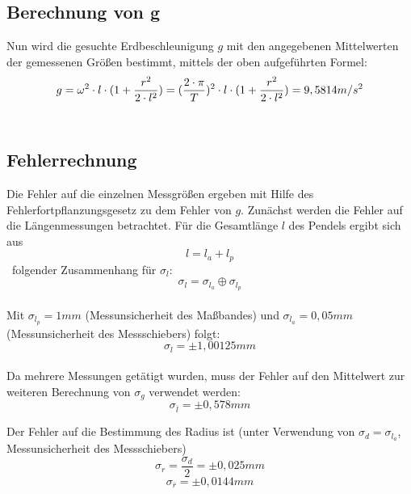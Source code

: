 \documentclass[a4paper, 11pt]{article}
\begin{document}
\subsection{Berechnung von g}
Nun wird die gesuchte Erdbeschleunigung $g$ mit den angegebenen Mittelwerten der gemessenen Größen bestimmt, mittels der oben aufgeführten Formel:
\begin{equation*}
g = \omega^2 \cdot l \cdot (1+\frac{r^2}{2 \cdot l^2})   \\  
= (\frac{2\cdot \pi}{T}) ^2 \cdot l \cdot (1+\frac{r^2}{2 \cdot l^2}) = 9,5814 m/s^2
\end{equation*}\

\subsection{Fehlerrechnung}
Die Fehler auf die einzelnen Messgrößen ergeben mit Hilfe des Fehlerfortpflanzungsgesetz zu dem Fehler von $g$.
Zunächst werden die Fehler auf die Längenmessungen betrachtet.
Für die Gesamtlänge $l$ des Pendels ergibt sich aus \begin{equation*}
l = l_a + l_p
\end{equation*}\
folgender Zusammenhang für $\sigma_l $:
\\
\begin{equation*}
\sigma_l = \sigma_{l_a} \oplus \sigma_{l_p}
\end{equation*}
\\
Mit $\sigma_{l_p}=1mm$ (Messunsicherheit des Maßbandes) und $\sigma_{l_a}=0,05mm$ (Messunsicherheit des Messschiebers) folgt:
\begin{equation*}
\sigma_l = \pm1,00125mm
\end{equation*}
\\
Da mehrere Messungen getätigt wurden, muss der Fehler auf den Mittelwert zur weiteren Berechnung von $\sigma_g$ verwendet werden:
\begin{equation*}
\sigma_{\overline{l}} = \pm0,578mm
\end{equation*}

Der Fehler auf die Bestimmung des Radius ist (unter Verwendung von $\sigma_d=\sigma_{l_a}$, Messunsicherheit des Messschiebers)
\begin{equation*}
\sigma_r = \frac{\sigma_d}{2} = \pm0,025 mm
\end{equation*}
\begin{equation*}
\sigma_{\overline{r}} = \pm0,0144mm
\end{equation*}
\end{document}
